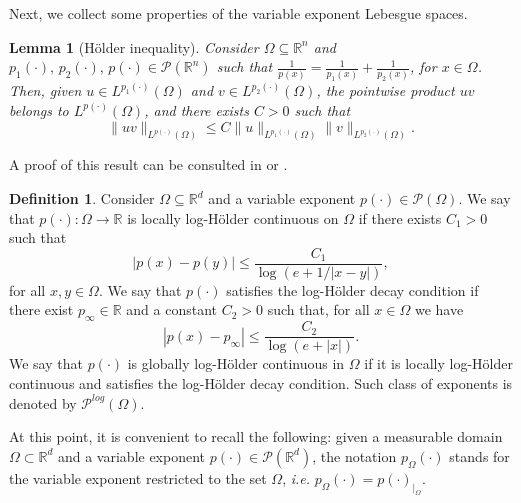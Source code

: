 \documentclass[a4paper,12pt]{amsart}
\theoremstyle{definition}
\newtheorem{definition}{Definition}[section]
\theoremstyle{plain}
\newtheorem{lemma}{Lemma}[section]
\def\Rt{\mathbb{R}^d}
\begin{document}
Next, we collect some properties of the variable exponent Lebesgue spaces. 
\begin{lemma}[H\"{o}lder inequality]
Consider $\Omega\subseteq \mathbb{R}^n$ and $p_1(\cdot),\,p_2(\cdot),\,p(\cdot)\in \mathcal{P}(\mathbb{R}^n)$ such that 
$\frac{1}{p(x)}=\frac{1}{p_1(x)}+\frac{1}{p_2(x)}$, for $x\in \Omega$. 
Then, given $u\in L^{p_1(\cdot)}(\Omega) $ and $v \in L^{p_2(\cdot)}(\Omega)$, the pointwise product $uv$ belongs to  $L^{p(\cdot)}(\Omega)$, and there exists  $C>0$ such that 
\begin{equation}\label{eq2.3}
\|uv\|_{L^{p(\cdot)}(\Omega)} \leq C\|u\|_{L^{p_1(\cdot)}(\Omega)}\|v\|_{L^{p_2(\cdot)}(\Omega)}.
\end{equation}
\end{lemma}
A proof of this result can be consulted in \cite[Corollary 2.28]{CRUZ} or  \cite[Lemma 3.2.20]{Diening_Libro}.
\begin{definition}\label{globallogholder}
Consider $\Omega\subseteq \mathbb{R}^d$ 
and a variable exponent $p(\cdot)\in \mathcal{P}(\Omega)$.
We say that  $ p(\cdot): \Omega \to \mathbb{R} $ is  locally log-Hölder continuous on $ \Omega $ if there exists $ C_1 > 0 $ such that
\begin{equation}\label{relation_loc_logholder}
|p(x) - p(y)| \leq \frac{C_1}{\log(e + 1/|x - y|)},
\end{equation}
for all $ x, y \in \Omega $. We say that $p(\cdot) $ satisfies the  log-Hölder decay condition if there exist $ p_\infty \in \mathbb{R} $ and a constant $ C_2 > 0 $ such that, for all $ x \in \Omega $ we have
\begin{equation}\label{relation_decay_logholder}
|p(x) -  p_\infty| \leq \frac{C_2}{\log(e + |x|)}
.
\end{equation}
 We say that $ p(\cdot) $ is  globally log-Hölder continuous in $ \Omega $ if it is locally log-Hölder continuous and satisfies the log-Hölder decay condition. 
Such class of exponents is denoted by 
$\mathcal{P}^{log}(\Omega)$. 
\end{definition}
At this point,  it is convenient to recall the following: 
given a measurable domain  $ \Omega \subset \Rt$ and a variable exponent $p(\cdot) \in \mathcal{P}(\Rt)$,  the notation 
$p_\Omega(\cdot)$ stands for the variable exponent restricted to the set $\Omega$, \emph{i.e.} ${p}_\Omega(\cdot)=  p  (\cdot)_{|_{\Omega}}$. 
\end{document}
